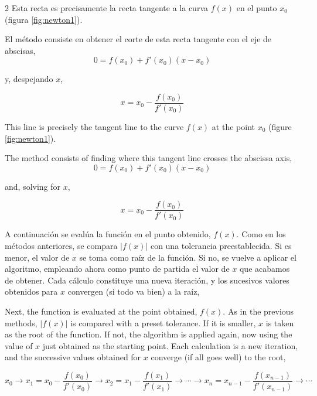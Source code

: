\begin{paracol}{2}
Esta recta es precisamente la recta tangente a la curva $f(x)$ en el punto $x_0$ (figura \ref{fig:newton1}).

El método consiste en obtener el corte de esta recta tangente con el eje de abscisas,
\begin{equation*}
0= f(x_0)+f'(x_0)(x-x_0)
\end{equation*}

y, despejando $x$,

\begin{equation*}
x=x_0-\frac{f(x_0)}{f'(x_0)}
\end{equation*}

\switchcolumn
This line is precisely the tangent line to the curve $f(x)$ at the point $x_0$ (figure \ref{fig:newton1}).

The method consists of finding where this tangent line crosses the abscissa axis,
\begin{equation*}
0= f(x_0)+f'(x_0)(x-x_0)
\end{equation*}

and, solving for $x$,

\begin{equation*}
x=x_0-\frac{f(x_0)}{f'(x_0)}
\end{equation*}

\switchcolumn
A continuación se evalúa la función en el punto obtenido, $f(x)$. Como en los métodos anteriores, se compara $\vert f(x)\vert$ con una tolerancia preestablecida. Si es menor, el valor de $x$ se toma como raíz de la función. Si no, se vuelve a aplicar el algoritmo, empleando ahora como punto de partida el valor de $x$ que acabamos de obtener. Cada cálculo constituye una nueva iteración, y los sucesivos valores obtenidos para $x$ convergen (si todo va bien) a la raíz,

\switchcolumn

Next, the function is evaluated at the point obtained, $f(x)$. As in the previous methods, $\vert f(x)\vert$ is compared with a preset tolerance. If it is smaller, $x$ is taken as the root of the function. If not, the algorithm is applied again, now using the value of $x$ just obtained as the starting point. Each calculation is a new iteration, and the successive values obtained for $x$ converge (if all goes well) to the root,

\end{paracol}

\begin{equation*}
x_0\rightarrow x_1=x_0-\frac{f(x_0)}{f'(x_0)}\rightarrow x_2=x_1-\frac{f(x_1)}{f'(x_1)}\rightarrow  \cdots \rightarrow x_n=x_{n-1}-\frac{f(x_{n-1})}{f'(x_{n-1})}\rightarrow \cdots
\end{equation*}


